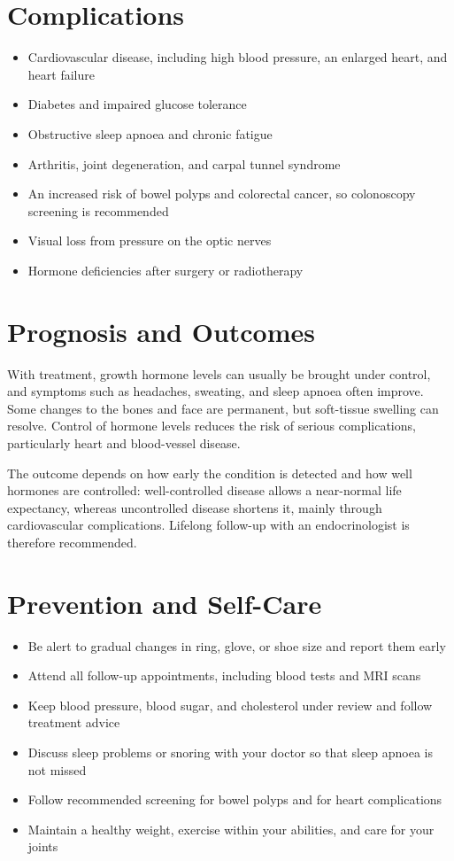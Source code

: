 \section*{Complications}
\begin{itemize}
    \item Cardiovascular disease, including high blood pressure, an enlarged heart, and heart failure
    \item Diabetes and impaired glucose tolerance
    \item Obstructive sleep apnoea and chronic fatigue
    \item Arthritis, joint degeneration, and carpal tunnel syndrome
    \item An increased risk of bowel polyps and colorectal cancer, so colonoscopy screening is recommended
    \item Visual loss from pressure on the optic nerves
    \item Hormone deficiencies after surgery or radiotherapy
\end{itemize}

\section*{Prognosis and Outcomes}
With treatment, growth hormone levels can usually be brought under control, and symptoms such as headaches, sweating, and sleep apnoea often improve. Some changes to the bones and face are permanent, but soft-tissue swelling can resolve. Control of hormone levels reduces the risk of serious complications, particularly heart and blood-vessel disease.

The outcome depends on how early the condition is detected and how well hormones are controlled: well-controlled disease allows a near-normal life expectancy, whereas uncontrolled disease shortens it, mainly through cardiovascular complications. Lifelong follow-up with an endocrinologist is therefore recommended.

\section*{Prevention and Self-Care}
\begin{itemize}
    \item Be alert to gradual changes in ring, glove, or shoe size and report them early
    \item Attend all follow-up appointments, including blood tests and MRI scans
    \item Keep blood pressure, blood sugar, and cholesterol under review and follow treatment advice
    \item Discuss sleep problems or snoring with your doctor so that sleep apnoea is not missed
    \item Follow recommended screening for bowel polyps and for heart complications
    \item Maintain a healthy weight, exercise within your abilities, and care for your joints
\end{itemize}

